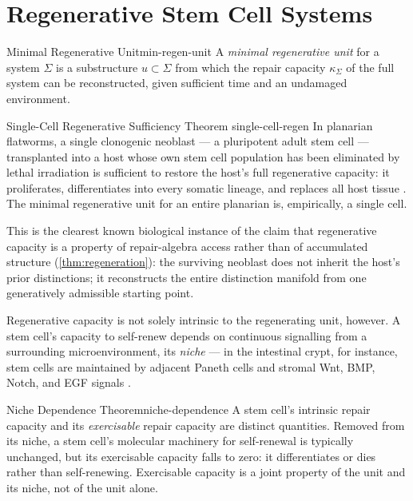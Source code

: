 \documentclass[12pt,twoside,openright]{book}
\begin{document}
\section{Regenerative Stem Cell Systems}

\begin{definition}{Minimal Regenerative Unit}{min-regen-unit}
  A \emph{minimal regenerative unit} for a system $\Sigma$ is a
  substructure $u \subset \Sigma$ from which the repair
  capacity $\kappa_\Sigma$ of the full system can be
  reconstructed, given sufficient time and an undamaged
  environment.
\end{definition}

\begin{theorem}{Single-Cell Regenerative Sufficiency Theorem}%
  {single-cell-regen}
  In planarian flatworms, a single clonogenic neoblast --- a
  pluripotent adult stem cell --- transplanted into a host
  whose own stem cell population has been eliminated by lethal
  irradiation is sufficient to restore the host's full
  regenerative capacity: it proliferates, differentiates into
  every somatic lineage, and replaces all host tissue
  \parencite{wagner2011}. The minimal regenerative unit for an
  entire planarian is, empirically, a single cell.
\end{theorem}

This is the clearest known biological instance of the claim
that regenerative capacity is a property of repair-algebra
access rather than of accumulated structure
(\cref{thm:regeneration}): the surviving neoblast does not
inherit the host's prior distinctions; it reconstructs the
entire distinction manifold from one generatively admissible
starting point.

Regenerative capacity is not solely intrinsic to the
regenerating unit, however. A stem cell's capacity to
self-renew depends on continuous signalling from a surrounding
microenvironment, its \emph{niche} --- in the intestinal crypt,
for instance, stem cells are maintained by adjacent Paneth
cells and stromal Wnt, BMP, Notch, and EGF signals
\parencite{li2010stemcell}.

\begin{theorem}{Niche Dependence Theorem}{niche-dependence}
  A stem cell's intrinsic repair capacity and its
  \emph{exercisable} repair capacity are distinct quantities.
  Removed from its niche, a stem cell's molecular machinery for
  self-renewal is typically unchanged, but its exercisable
  capacity falls to zero: it differentiates or dies rather than
  self-renewing. Exercisable capacity is a joint property of
  the unit and its niche, not of the unit alone.
\end{theorem}
\end{document}
